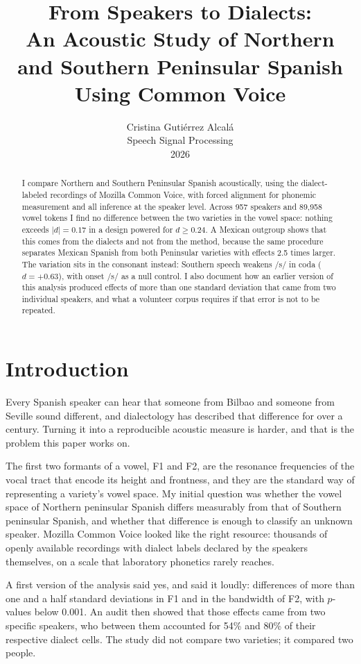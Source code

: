 \documentclass[11pt]{article}
\title{From Speakers to Dialects:\\An Acoustic Study of Northern and Southern
Peninsular Spanish Using Common Voice}
\author{Cristina Guti\'errez Alcal\'a \\
  Speech Signal Processing \\
  2026}
\begin{document}
\maketitle

\begin{abstract}
I compare Northern and Southern Peninsular Spanish acoustically, using the
dialect-labeled recordings of Mozilla Common Voice, with forced alignment for
phonemic measurement and all inference at the speaker level. Across 957 speakers
and 89,958 vowel tokens I find no difference between the two varieties in the
vowel space: nothing exceeds $|d| = 0.17$ in a design powered for
$d \geq 0.24$. A Mexican outgroup shows that this comes from the dialects and
not from the method, because the same procedure separates Mexican Spanish from
both Peninsular varieties with effects 2.5 times larger. The variation sits in
the consonant instead: Southern speech weakens /s/ in coda ($d = +0.63$), with
onset /s/ as a null control. I also document how an earlier version of this
analysis produced effects of more than one standard deviation that came from two
individual speakers, and what a volunteer corpus requires if that error is not to
be repeated.
\end{abstract}

\section{Introduction}

Every Spanish speaker can hear that someone from Bilbao and someone from Seville
sound different, and dialectology has described that difference for over a
century. Turning it into a reproducible acoustic measure is harder, and that is
the problem this paper works on.

The first two formants of a vowel, F1 and F2, are the resonance frequencies of
the vocal tract that encode its height and frontness, and they are the standard
way of representing a variety's vowel space. My initial question was whether the
vowel space of Northern peninsular Spanish differs measurably from that of
Southern peninsular Spanish, and whether that difference is enough to classify an
unknown speaker. Mozilla Common Voice looked like the right resource: thousands
of openly available recordings with dialect labels declared by the speakers
themselves, on a scale that laboratory phonetics rarely reaches.

A first version of the analysis said yes, and said it loudly: differences of more
than one and a half standard deviations in F1 and in the bandwidth of F2, with
$p$-values below 0.001. An audit then showed that those effects came from two
specific speakers, who between them accounted for 54\% and 80\% of their
respective dialect cells. The study did not compare two varieties; it compared
two people.
\end{document}
